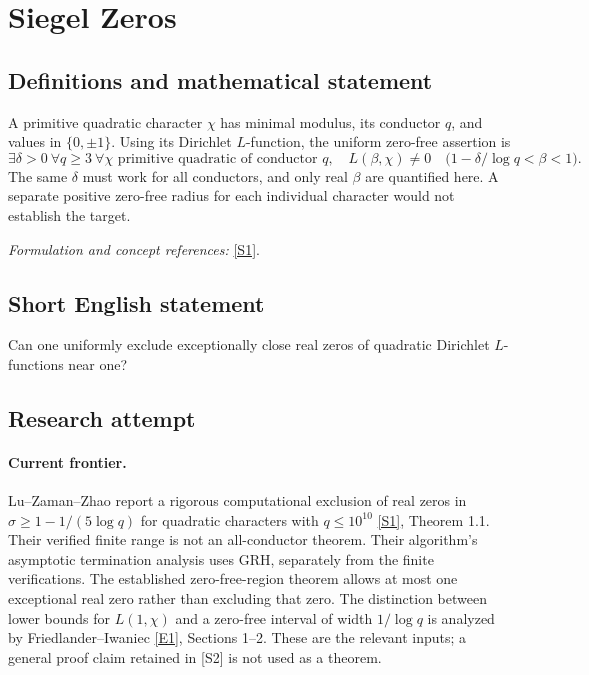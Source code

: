 \documentclass[11pt,a4paper]{article}
\newcommand{\sref}[2]{\hyperlink{source:#1:#2}{[S#2]}}
\newcommand{\eref}[2]{\hyperlink{extra:#1:#2}{[E#2]}}
\newif\ifshowcatalogue
\newcommand{\cataloguescope}[1]{\ifshowcatalogue
 \paragraph{Exact scope in the supplied catalogue.}
 \begin{quote}\small #1\end{quote}\fi}
\numberwithin{equation}{section}
\begin{document}
\setcounter{section}{0}
\clearpage
\section*{\texorpdfstring{Siegel Zeros}{Siegel Zeros}}\label{1509}
\subsection{Definitions and mathematical statement}
A primitive quadratic character $\chi$ has minimal modulus, its conductor $q$, and values in $\{0,\pm1\}$. Using its Dirichlet $L$-function, the uniform zero-free assertion is
\[
 \exists\delta>0\ \forall q\ge3\ \forall\chi\text{ primitive quadratic of conductor }q,
 \quad L(\beta,\chi)\ne0\quad\bigl(1-\delta/\log q<\beta<1\bigr).
\]
The same $\delta$ must work for all conductors, and only real $\beta$ are quantified here. A separate positive zero-free radius for each individual character would not establish the target.
\par\smallskip\textit{Formulation and concept references:} \sref{1509}{1}.
\cataloguescope{Does there exist an absolute constant \ensuremath{\delta}>0 such that, for every primitive quadratic Dirichlet character \ensuremath{\chi} of conductor q\ensuremath{\ge}3, L(\ensuremath{\beta},\ensuremath{\chi})\ensuremath{\ne}0 for every real \ensuremath{\beta} with 1\ensuremath{-}\ensuremath{\delta}/log q<\ensuremath{\beta}<1? The logarithm is natural and the same \ensuremath{\delta} must work for all conductors.}
\subsection{Short English statement}
Can one uniformly exclude exceptionally close real zeros of quadratic Dirichlet $L$-functions near one?
\subsection{Research attempt}
\paragraph{Current frontier.}
Lu--Zaman--Zhao report a rigorous computational exclusion of real zeros in
$\sigma\ge1-1/(5\log q)$ for quadratic characters with $q\le10^{10}$
\sref{1509}{1}, Theorem 1.1. Their verified finite range is not an
all-conductor theorem. Their algorithm's asymptotic termination analysis
uses GRH, separately from the finite verifications. The established
zero-free-region theorem allows at most one exceptional real zero rather
than excluding that zero. The distinction between lower bounds for
$L(1,\chi)$ and a zero-free interval of width $1/\log q$ is analyzed by
Friedlander--Iwaniec \eref{1509}{1}, Sections 1--2. These are the relevant
inputs; a general proof claim retained in [S2] is not used as a theorem.
\end{document}
